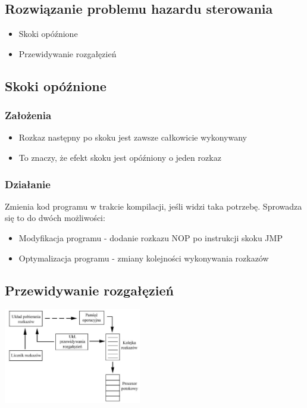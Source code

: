 \documentclass[a4paper,twoside]{article}
\begin{document}
\subsection{Rozwiązanie problemu hazardu sterowania}
\begin{itemize}
	\item Skoki opóźnione
	\item Przewidywanie rozgałęzień
\end{itemize}

\subsection{Skoki opóźnione}
\subsubsection{Założenia}
\begin{itemize}
	\item Rozkaz następny po skoku jest zawsze całkowicie wykonywany
	\item To znaczy, że efekt skoku jest opóźniony o jeden rozkaz
\end{itemize}
\subsubsection{Działanie}
Zmienia kod programu w trakcie kompilacji, jeśli widzi taka potrzebę. Sprowadza się to do dwóch możliwości:
\begin{itemize}
	\item Modyfikacja programu - dodanie rozkazu NOP po instrukcji skoku JMP
	\item Optymalizacja programu - zmiany kolejności wykonywania rozkazów
\end{itemize}

\subsection{Przewidywanie rozgałęzień}
\begin{center}
	\includegraphics[width=0.45\textwidth]{./images/potok04}
\end{center}
\end{document}
